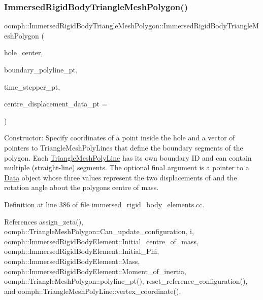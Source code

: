 \subsubsection{\texorpdfstring{Immersed\+Rigid\+Body\+Triangle\+Mesh\+Polygon()}{ImmersedRigidBodyTriangleMeshPolygon()}}
{\footnotesize\ttfamily oomph\+::\+Immersed\+Rigid\+Body\+Triangle\+Mesh\+Polygon\+::\+Immersed\+Rigid\+Body\+Triangle\+Mesh\+Polygon (\begin{DoxyParamCaption}\item[{const \hyperlink{classoomph_1_1Vector}{Vector}$<$ double $>$ \&}]{hole\+\_\+center,  }\item[{const \hyperlink{classoomph_1_1Vector}{Vector}$<$ \hyperlink{classoomph_1_1TriangleMeshCurveSection}{Triangle\+Mesh\+Curve\+Section} $\ast$$>$ \&}]{boundary\+\_\+polyline\+\_\+pt,  }\item[{\hyperlink{classoomph_1_1TimeStepper}{Time\+Stepper} $\ast$const \&}]{time\+\_\+stepper\+\_\+pt,  }\item[{\hyperlink{classoomph_1_1Data}{Data} $\ast$const \&}]{centre\+\_\+displacement\+\_\+data\+\_\+pt = {} }\end{DoxyParamCaption})}



Constructor\+: Specify coordinates of a point inside the hole and a vector of pointers to Triangle\+Mesh\+Poly\+Lines that define the boundary segments of the polygon. Each \hyperlink{classoomph_1_1TriangleMeshPolyLine}{Triangle\+Mesh\+Poly\+Line} has its own boundary ID and can contain multiple (straight-\/line) segments. The optional final argument is a pointer to a \hyperlink{classoomph_1_1Data}{Data} object whose three values represent the two displacements of and the rotation angle about the polygon\textquotesingle{}s centre of mass. 



Definition at line 386 of file immersed\+\_\+rigid\+\_\+body\+\_\+elements.\+cc.



References assign\+\_\+zeta(), oomph\+::\+Triangle\+Mesh\+Polygon\+::\+Can\+\_\+update\+\_\+configuration, i, oomph\+::\+Immersed\+Rigid\+Body\+Element\+::\+Initial\+\_\+centre\+\_\+of\+\_\+mass, oomph\+::\+Immersed\+Rigid\+Body\+Element\+::\+Initial\+\_\+\+Phi, oomph\+::\+Immersed\+Rigid\+Body\+Element\+::\+Mass, oomph\+::\+Immersed\+Rigid\+Body\+Element\+::\+Moment\+\_\+of\+\_\+inertia, oomph\+::\+Triangle\+Mesh\+Polygon\+::polyline\+\_\+pt(), reset\+\_\+reference\+\_\+configuration(), and oomph\+::\+Triangle\+Mesh\+Poly\+Line\+::vertex\+\_\+coordinate().



